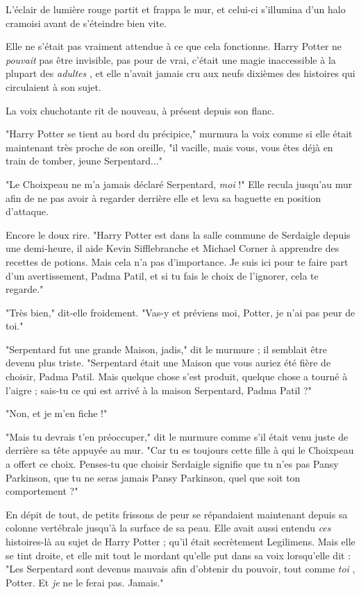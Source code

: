 L'éclair de lumière rouge partit et frappa le mur, et celui-ci s'illumina d'un halo cramoisi avant de s'éteindre bien vite.

Elle ne s'était pas vraiment attendue à ce que cela fonctionne. Harry Potter ne \emph{pouvait } pas être invisible, pas pour de vrai, c'était une magie inaccessible à la plupart des \emph{adultes} , et elle n'avait jamais cru aux neufs dixièmes des histoires qui circulaient à son sujet.

La voix chuchotante rit de nouveau, à présent depuis son flanc.

"Harry Potter se tient au bord du précipice," murmura la voix comme si elle était maintenant très proche de son oreille, "il vacille, mais vous, vous êtes déjà en train de tomber, jeune Serpentard..."

"Le Choixpeau ne m'a jamais déclaré Serpentard, \emph{moi}  !" Elle recula jusqu'au mur afin de ne pas avoir à regarder derrière elle et leva sa baguette en position d'attaque.

Encore le doux rire. "Harry Potter est dans la salle commune de Serdaigle depuis une demi-heure, il aide Kevin Sifflebranche et Michael Corner à apprendre des recettes de potions. Mais cela n'a pas d'importance. Je suis ici pour te faire part d'un avertissement, Padma Patil, et si tu fais le choix de l'ignorer, cela te regarde."

"Très bien," dit-elle froidement. "Vas-y et préviens moi, Potter, je n'ai pas peur de toi."

"Serpentard fut une grande Maison, jadis," dit le murmure ; il semblait être devenu plus triste. "Serpentard était une Maison que vous auriez été fière de choisir, Padma Patil. Mais quelque chose s'est produit, quelque chose a tourné à l'aigre ; sais-tu ce qui est arrivé à la maison Serpentard, Padma Patil ?"

"Non, et je m'en fiche !"

"Mais tu devrais t'en préoccuper," dit le murmure comme s'il était venu juste de derrière sa tête appuyée au mur. "Car tu es toujours cette fille à qui le Choixpeau a offert ce choix. Penses-tu que choisir Serdaigle signifie que tu n'es pas Pansy Parkinson, que tu ne seras jamais Pansy Parkinson, quel que soit ton comportement ?"

En dépit de tout, de petits frissons de peur se répandaient maintenant depuis sa colonne vertébrale jusqu'à la surface de sa peau. Elle avait aussi entendu \emph{ces}  histoires-là au sujet de Harry Potter ; qu'il était secrètement Legilimens. Mais elle se tint droite, et elle mit tout le mordant qu'elle put dans sa voix lorsqu'elle dit : "Les Serpentard sont devenus mauvais afin d'obtenir du pouvoir, tout comme \emph{toi} , Potter. Et \emph{je}  ne le ferai pas. Jamais."

